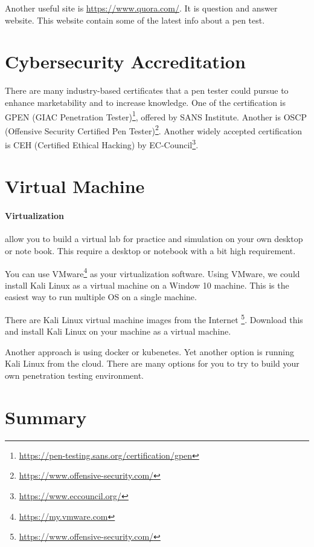 \documentclass[7x9]{times}
\begin{document}
Another useful site is \url{https://www.quora.com/}. It is
question and answer website. This website contain some of
the latest info about a pen test.



\section{Cybersecurity Accreditation}

There are many industry-based certificates that a pen tester
could pursue to enhance marketability and to increase
knowledge. One of the certification is GPEN (GIAC
Penetration Tester)\footnote{
    \url{https://pen-testing.sans.org/certification/gpen}},
offered by SANS Institute. Another is OSCP (Offensive
Security Certified Pen Tester)\footnote{
\url{https://www.offensive-security.com/}}.  Another widely
accepted certification is CEH (Certified Ethical Hacking) by
EC-Council\footnote{\url{https://www.eccouncil.org/}}.


\section{Virtual Machine}

\paragraph{Virtualization} allow you to build a virtual lab 
for practice and simulation on your own desktop or note 
book. This require a desktop or notebook with a bit high 
requirement.

You can use
VMware\footnote{\url{https://my.vmware.com}}
 as your virtualization software. Using VMware, we could 
install Kali Linux as a virtual machine on a Window 10 
machine. This is the easiest way to run multiple OS on a 
single machine.

There are Kali Linux virtual machine images from the
Internet
\footnote{\url{https://www.offensive-security.com/}}.
 Download this and install Kali Linux on your
machine as a virtual machine.

Another approach is using docker or kubenetes. Yet another
option is running Kali Linux from the cloud. There are many
options for you to try to build your own penetration testing
environment.


\section{Summary}
\end{document}
